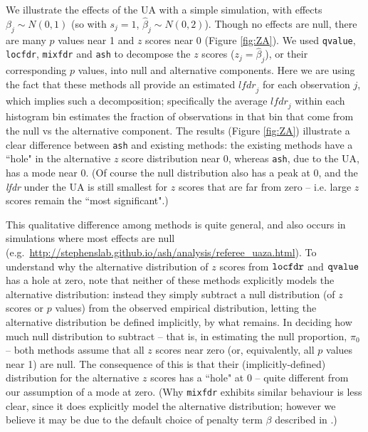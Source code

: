 \documentclass[11pt]{article}
\def\lfdr{\textit{lfdr}}
\def\bhat{\hat{\beta}}
\def\qvalue{{\tt qvalue}\xspace}
\def\locfdr{{\tt locfdr}\xspace}
\def\mixfdr{{\tt mixfdr}\xspace}
\def\ash{{\tt ash}\xspace}
\begin{document}
We illustrate the effects of the UA with a simple simulation, 
 with effects $\beta_j \sim N(0,1)$ (so with $s_j=1$, $\bhat_j  \sim N(0,2)$). Though no effects are null, there are many $p$ values near 1 and $z$ scores near 0 (Figure \ref{fig:ZA}).  We used
\qvalue, \locfdr, \mixfdr and \ash to decompose the $z$ scores ($z_j = \bhat_j$), or their corresponding $p$ values, into null and alternative components.
Here we are using the fact that these methods all provide an estimated $\lfdr_j$ for each observation $j$, which
implies such a decomposition;  specifically the average $\lfdr_j$ within each histogram bin estimates the fraction of observations in that bin that come from the null vs the alternative component. The results (Figure \ref{fig:ZA}) illustrate a clear difference between \ash and existing methods:
the existing methods have a ``hole"  in the alternative $z$ score distribution near 0, whereas \ash, due to the UA, has a mode near 0.
(Of course the null distribution also has a peak at 0, and the \lfdr{} 
 under the UA is still smallest for $z$ scores that are far from zero -- i.e. large $z$ scores remain the ``most significant".)
 
This qualitative difference among methods is quite general, and 
also occurs in simulations where most effects are null (e.g.~\url{http://stephenslab.github.io/ash/analysis/referee_uaza.html}). To understand why the alternative distribution of $z$ scores from $\locfdr$ and $\qvalue$ has a hole at zero, note that neither
of these methods explicitly models the alternative distribution: instead they simply subtract a null distribution (of $z$ scores or $p$ values) from the observed empirical distribution, letting the alternative
distribution be defined implicitly, by what remains.
 In deciding how much null distribution to subtract -- that is, in estimating the null proportion, $\pi_0$ -- 
 both methods assume that all $z$ scores near zero (or, equivalently,
all $p$ values near 1) are null. The consequence of this is that their (implicitly-defined) distribution for the alternative $z$ scores has 
a ``hole" at 0 -- quite different from our assumption of a mode at zero. (Why \mixfdr exhibits similar behaviour is less clear, since it does explicitly
model the alternative distribution; however we believe it may be due to the default choice of penalty term $\beta$ described in \cite{muralidharan2010empirical}.)
\end{document}

